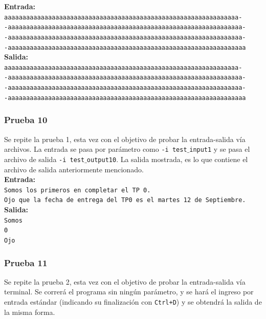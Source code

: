 \documentclass[a4paper, 10pt]{article}
\def\code#1{\texttt{#1}}
\newcommand\tab[1][0.5cm]{\hspace*{#1}}
\begin{document}
        \textbf{Entrada:}\\
        \tab\tab\code{aaaaaaaaaaaaaaaaaaaaaaaaaaaaaaaaaaaaaaaaaaaaaaaaaaaaaaaaaaaaaaaa-\\-aaaaaaaaaaaaaaaaaaaaaaaaaaaaaaaaaaaaaaaaaaaaaaaaaaaaaaaaaaaaaaaa-\\-aaaaaaaaaaaaaaaaaaaaaaaaaaaaaaaaaaaaaaaaaaaaaaaaaaaaaaaaaaaaaaaa-\\-aaaaaaaaaaaaaaaaaaaaaaaaaaaaaaaaaaaaaaaaaaaaaaaaaaaaaaaaaaaaaaaaa}\\

        \textbf{Salida:}\\
        \tab\tab\code{aaaaaaaaaaaaaaaaaaaaaaaaaaaaaaaaaaaaaaaaaaaaaaaaaaaaaaaaaaaaaaaa-\\-aaaaaaaaaaaaaaaaaaaaaaaaaaaaaaaaaaaaaaaaaaaaaaaaaaaaaaaaaaaaaaaa-\\-aaaaaaaaaaaaaaaaaaaaaaaaaaaaaaaaaaaaaaaaaaaaaaaaaaaaaaaaaaaaaaaa-\\-aaaaaaaaaaaaaaaaaaaaaaaaaaaaaaaaaaaaaaaaaaaaaaaaaaaaaaaaaaaaaaaaa}\\

      \subsubsection{Prueba 10}
        Se repite la prueba 1, esta vez con el objetivo de probar la entrada-salida vía archivos.
        La entrada se pasa por parámetro como  \code{-i test$\_$input1} y se pasa el archivo de salida
         \code{-i test$\_$output10}. La salida mostrada, es lo que contiene el archivo de salida
        anteriormente mencionado.\\

				\textbf{Entrada:}\\
				\tab\tab\code{Somos los primeros en completar el TP 0.}\\
				\tab\tab\code{Ojo que la fecha de entrega del TP0 es el martes 12 de Septiembre.}\\

        \textbf{Salida:}\\
				\tab\tab\code{Somos}\\
        \tab\tab\code{0}\\
				\tab\tab\code{Ojo}

      \subsubsection{Prueba 11}
        Se repite la prueba 2, esta vez con el objetivo de probar la entrada-salida vía terminal.
        Se correrá el programa sin ningún parámetro, y se hará el ingreso por entrada estándar
        (indicando su finalización con \code{Ctrl+D}) y se obtendrá la salida de la misma forma.\\
\end{document}
